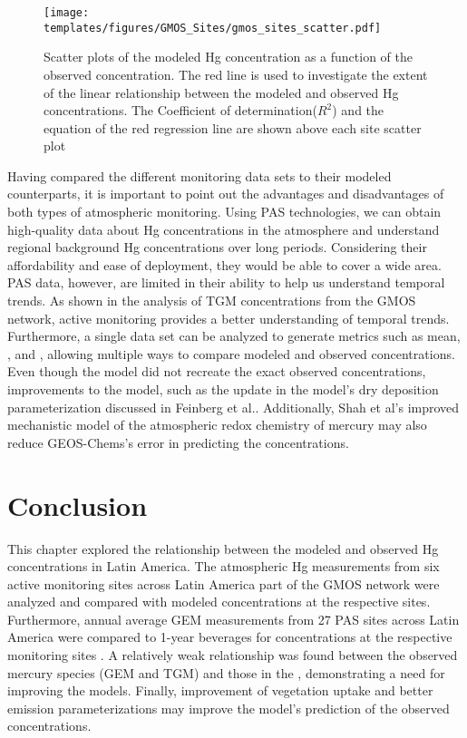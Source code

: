  \begin{figure}[H]
\texttt{[image: templates/figures/GMOS\_Sites/gmos\_sites\_scatter.pdf]}
\centering
\caption[Scatter plots of the modeled Hg concentration as a function of the observed concentration.]{Scatter plots of the modeled Hg concentration as a function of the observed concentration. The red line is used to investigate the extent of the linear relationship between the modeled and observed Hg concentrations. The Coefficient of determination($R^2$) and the equation of the red regression line are shown above each site scatter plot}
\label{fig:gmos_sites_scatter}
\end{figure}
\FloatBarrier
\begin{flushleft}
 Having compared the different monitoring data sets to their modeled counterparts, it is important to point out the advantages and disadvantages of both types of atmospheric monitoring. Using PAS technologies, we can obtain high-quality data about Hg concentrations in the atmosphere and understand regional background Hg concentrations over long periods. Considering their affordability and ease of deployment, they would be able to cover a wide area. PAS data, however, are limited in their ability to help us understand temporal trends. As shown in the analysis of TGM concentrations from the GMOS network, active monitoring provides a better understanding of temporal trends. Furthermore, a single data set can be analyzed to generate metrics such as mean, \iq, and \nft, allowing multiple ways to compare modeled and observed concentrations.  Even though the model did not recreate the exact observed concentrations, improvements to the model, such as the update in the model's dry deposition parameterization discussed in Feinberg et al.\cite{feinberg_evaluating_2022}. Additionally, Shah et al\cite{shah_improved_2021}'s improved mechanistic model of the atmospheric redox chemistry of mercury may also reduce  GEOS-Chems's error in predicting the concentrations.
\end{flushleft}

\section{Conclusion}\label{c2_conclusion}

\begin{flushleft}
This chapter explored the relationship between the modeled and observed Hg concentrations in Latin America. The atmospheric Hg measurements from six active monitoring sites  across Latin America part of the GMOS network were analyzed and compared with modeled \hg concentrations at the respective sites\cite{koenig_seasonal_2021,sprovieri_atmospheric_2016}. Furthermore, annual average GEM measurements from 27 PAS sites across Latin America were compared to 1-year beverages for \hg concentrations at the respective monitoring sites \cite{quant_measuring_2021}.  A relatively weak relationship was found between the observed mercury species (GEM and TGM) and those in the \on, demonstrating a need for improving the models. Finally, improvement of vegetation uptake and better emission parameterizations may improve the model's prediction of the observed concentrations.

\end{flushleft}